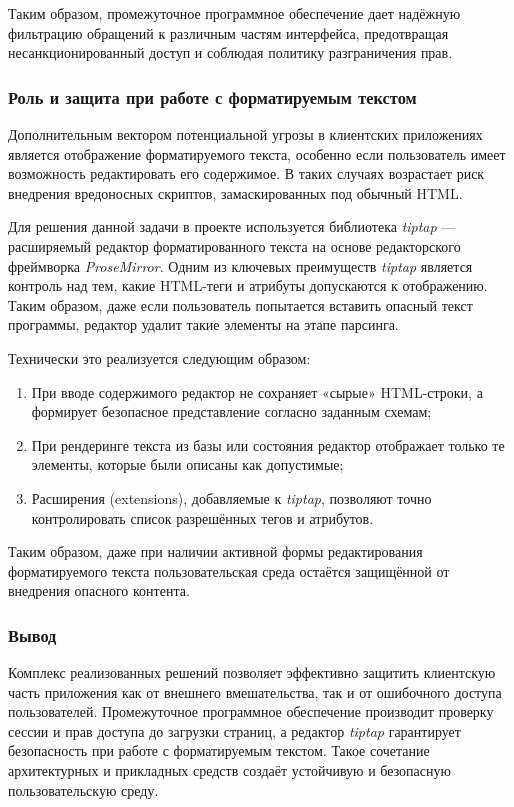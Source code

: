 Таким образом, промежуточное программное обеспечение дает надёжную фильтрацию обращений к различным частям интерфейса, предотвращая несанкционированный доступ и соблюдая политику разграничения прав.

\subsubsection{Роль и защита при работе с форматируемым текстом}
Дополнительным вектором потенциальной угрозы в клиентских приложениях является отображение форматируемого текста, особенно если пользователь имеет возможность редактировать его содержимое. В таких случаях возрастает риск внедрения вредоносных скриптов, замаскированных под обычный HTML.

Для решения данной задачи в проекте используется библиотека \textit{tiptap} — расширяемый редактор форматированного текста на основе редакторского фреймворка  \textit{ProseMirror}. Одним из ключевых преимуществ \textit{tiptap} является контроль над тем, какие HTML-теги и атрибуты допускаются к отображению. Таким образом, даже если пользователь попытается вставить опасный текст программы, редактор удалит такие элементы на этапе парсинга.

Технически это реализуется следующим образом:
\begin{enumerate}
  \item При вводе содержимого редактор не сохраняет «сырые» HTML-строки, а формирует безопасное представление согласно заданным схемам;
  \item При рендеринге текста из базы или состояния редактор отображает только те элементы, которые были описаны как допустимые;
  \item Расширения (extensions), добавляемые к \textit{tiptap}, позволяют точно контролировать список разрешённых тегов и атрибутов.
\end{enumerate}

Таким образом, даже при наличии активной формы редактирования форматируемого текста пользовательская среда остаётся защищённой от внедрения опасного контента.

\subsubsection{Вывод}

Комплекс реализованных решений позволяет эффективно защитить клиентскую часть приложения как от внешнего вмешательства, так и от ошибочного доступа пользователей. Промежуточное программное обеспечение производит проверку сессии и прав доступа до загрузки страниц, а редактор \textit{tiptap} гарантирует безопасность при работе с форматируемым текстом. Такое сочетание архитектурных и прикладных средств создаёт устойчивую и безопасную пользовательскую среду.
